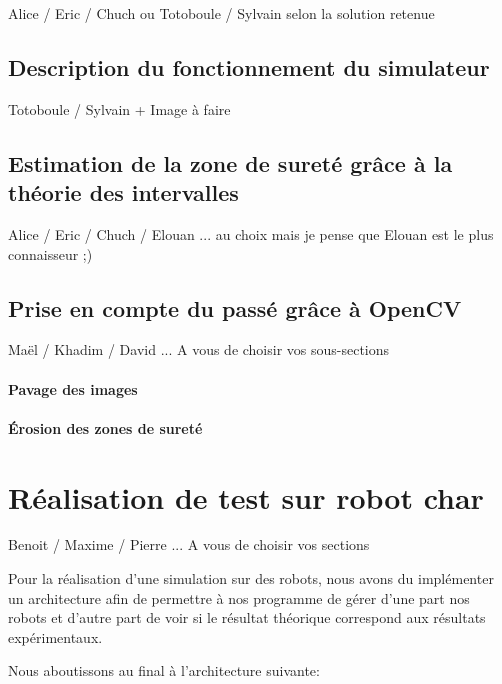 \documentclass[10pt,a4paper]{report}
\begin{document}
Alice / Eric / Chuch ou Totoboule / Sylvain selon la solution retenue

\section{Description du fonctionnement du simulateur}

Totoboule / Sylvain + Image à faire

\section{Estimation de la zone de sureté grâce à la théorie des intervalles}

Alice / Eric / Chuch / Elouan ... au choix mais je pense que Elouan est le plus connaisseur ;)


\section{Prise en compte du passé grâce à OpenCV}

Maël / Khadim / David  ... A vous de choisir vos sous-sections

\subsubsection{Pavage des images}

\subsubsection{Érosion des zones de sureté}


\chapter{Réalisation de test sur robot char}
Benoit / Maxime / Pierre ... A vous de choisir vos sections

Pour la réalisation d'une simulation sur des robots, nous avons du implémenter un architecture afin de permettre à nos programme de gérer d'une part nos robots et d'autre part de voir si le résultat théorique correspond aux résultats expérimentaux.

\medskip

Nous aboutissons au final à l'architecture suivante:

\bigskip
\end{document}

